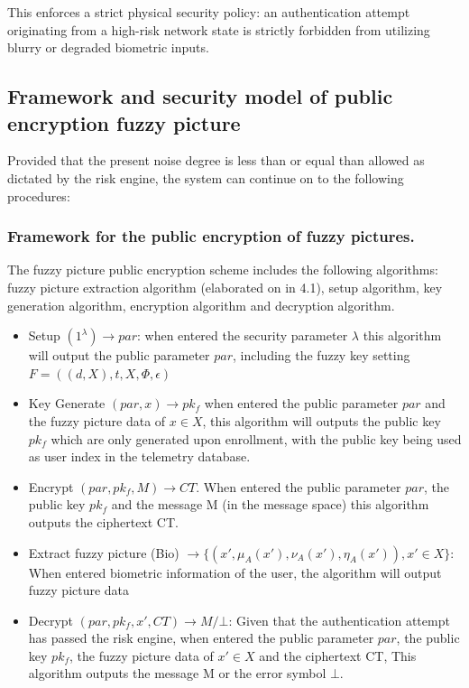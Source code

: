 \documentclass[pdflatex,sn-mathphys-num]{sn-jnl}
\theoremstyle{thmstyleone}%
\theoremstyle{thmstyletwo}%
\theoremstyle{thmstylethree}%
\begin{document}
This enforces a strict physical security policy: an authentication attempt originating from a high-risk network state is strictly forbidden from utilizing blurry or degraded biometric inputs.

\subsection{Framework and security model of public encryption fuzzy picture}
Provided that the present noise degree is less than or equal than allowed as dictated by the risk engine, the system can continue on to the following procedures:
\subsubsection{Framework for the public encryption of fuzzy pictures.}
The fuzzy picture public encryption scheme includes the following algorithms: fuzzy picture extraction algorithm (elaborated on in 4.1), setup algorithm, key generation algorithm, encryption algorithm and decryption algorithm.

\begin{itemize}
	\item Setup $(1^\lambda) \to par$: when entered the security parameter $\lambda$ this algorithm will output the public parameter $par$, including the fuzzy key setting $F = ((d, X), t, X, \Phi, \epsilon)$
	\item Key Generate $(par, x) \to pk_f$ when entered the public parameter $par$ and the fuzzy picture data of $x \in X$, this algorithm will outputs the public key $pk_f$ which are only generated upon enrollment, with the public key being used as user index in the telemetry database. 
	\item Encrypt $(par, pk_f, M) \to CT$. When entered the public parameter $par$, the public key $pk_f$ and the message M (in the message space) this algorithm outputs the ciphertext CT.
	\item Extract fuzzy picture (Bio) $\to \{(x', \mu_A(x'), \nu_A(x'), \eta_A(x')), x' \in X\}$: When entered biometric information of the user, the algorithm will output fuzzy picture data
	\item Decrypt $(par, pk_f, x', CT) \to M/\bot$: Given that the authentication attempt has passed the risk engine, when entered the public parameter $par$, the public key $pk_f$, the fuzzy picture data of $x' \in X$ and the ciphertext CT, This algorithm outputs the message M or the error symbol $\bot$.
\end{itemize}
\end{document}
